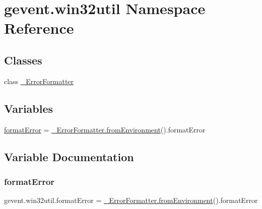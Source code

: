 \hypertarget{namespacegevent_1_1win32util}{}\section{gevent.\+win32util Namespace Reference}
\label{namespacegevent_1_1win32util}
\subsection*{Classes}
\begin{DoxyCompactItemize}
\item 
class \hyperlink{classgevent_1_1win32util_1_1___error_formatter}{\+\_\+\+Error\+Formatter}
\end{DoxyCompactItemize}
\subsection*{Variables}
\begin{DoxyCompactItemize}
\item 
\hyperlink{namespacegevent_1_1win32util_a1aefeaf07b82c57a57b7f5e76dc56762}{format\+Error} = \hyperlink{classgevent_1_1win32util_1_1___error_formatter_ad5e16793772869bf37441b45203f3ced}{\+\_\+\+Error\+Formatter.\+from\+Environment}().format\+Error
\end{DoxyCompactItemize}


\subsection{Variable Documentation}
\mbox{\label{namespacegevent_1_1win32util_a1aefeaf07b82c57a57b7f5e76dc56762}} 
\subsubsection{\texorpdfstring{format\+Error}{formatError}}
{\footnotesize\ttfamily gevent.\+win32util.\+format\+Error = \hyperlink{classgevent_1_1win32util_1_1___error_formatter_ad5e16793772869bf37441b45203f3ced}{\+\_\+\+Error\+Formatter.\+from\+Environment}().format\+Error}

